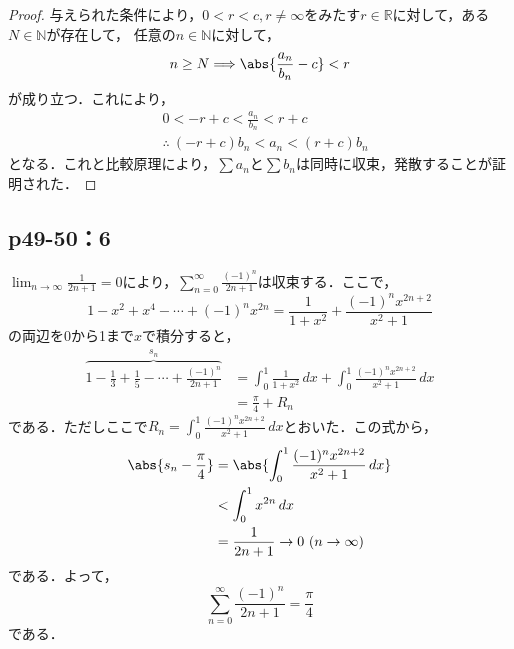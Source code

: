 \documentclass[uplatex,dvipdfmx,a4paper,10pt,fleqn]{jsarticle}
\begin{document}
    \begin{tleftbar}
        \begin{proof}
            与えられた条件により，$0 <r <c , r \ne \infty $をみたす$r \in \mathbb{R}$に対して，ある$N \in \mathbb{N}$が存在して，
            任意の$n \in \mathbb{N}$に対して，
            \[
                n \ge N \Longrightarrow \abs{\frac{a_n}{b_n}-c}<r
            \]
            が成り立つ．これにより，
            \begin{align*}
                & 0<-r +c < \frac{a_n}{b_n} < r+c \\
                &\therefore ~  (-r+c) b_n < a_n < (r+c) b_n
            \end{align*}
            となる．これと比較原理により，$\sum a_n$と$\sum b_n$は同時に収束，発散することが証明された．
        \end{proof}
    \end{tleftbar}

    \subsection*{p49-50：6}
    \begin{tleftbar}
        $\lim_{n \to \infty} \frac{1}{2n+1} =0$により，$\sum_{n=0}^{\infty} \frac{(-1)^n}{2n+1}$は収束する．ここで，
        \[
             1-x^2+x^4-\cdots+(-1)^n x^{2n} =\frac{1}{1+x^2} +\frac{(-1)^n x^{2n+2}}{x^2+1}
        \]
    の両辺を0から1まで$x$で積分すると，
    \begin{align*}
       \overbrace{1-\frac{1}{3}+\frac{1}{5}-\cdots+\frac{(-1)^n}{2n+1}}^{s_n} &=\int_{0}^{1} \frac{1}{1+x^2} \, dx +\int_{0}^{1}\frac{(-1)^n x^{2n+2}}{x^2+1}  \, dx \\
    & = \frac{\pi}{4} + R_n
    \end{align*}
    である．ただしここで$R_n =\int_{0}^{1}\frac{(-1)^n x^{2n+2}}{x^2+1} \, dx$とおいた．この式から，
    \begin{align*}
      \abs{s_n -\frac{\pi}{4}  } & = \abs{\int_{0}^{1}\frac{(-1)^n x^{2n+2}}{x^2+1} \, dx } \\
       & < \int_{0}^{1} x^{2n} \, dx \\
       & =\frac{1}{2n+1} \to 0 ~(n \to \infty)
    \end{align*}
    である．よって，
    \[
        \sum_{n=0}^{\infty} \frac{(-1)^n}{2n+1} =\frac{\pi}{4}
    \]
    である．
    \end{tleftbar}
\end{document}

